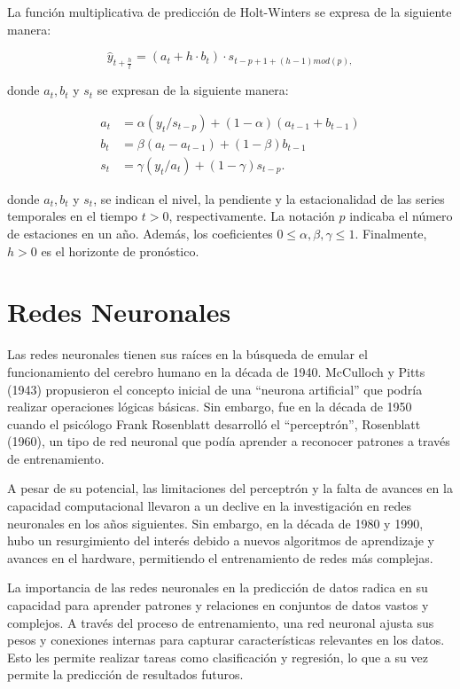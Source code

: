 \documentclass[
  letterpaper,
  DIV=11,
  numbers=noendperiod]{scrreport}
\theoremstyle{plain}
\theoremstyle{definition}
\theoremstyle{definition}
\theoremstyle{plain}
\theoremstyle{remark}
\begin{document}
La función multiplicativa de predicción de Holt-Winters se expresa de la
siguiente manera:

\[ \hat{y}_{t+\frac{h}{t}}= (a_t+h\cdot b_t)\cdot s_{t-p+1+(h-1)mod(p),} \]

donde \(a_t, b_t\) y \(s_t\) se expresan de la siguiente manera:

\[ \begin{split}a_t &= \alpha(y_t/s_{t-p})+(1-\alpha)(a_{t-1}+b_{t-1})\\ b_t &= \beta(a_t-a_{t-1})+(1-\beta)b_{t-1}\\ s_t &= \gamma(y_t/a_t)+(1-\gamma)s_{t-p}.\end{split} \]

donde \(a_t, b_t\) y \(s_t\), se indican el nivel, la pendiente y la
estacionalidad de las series temporales en el tiempo \(t>0\),
respectivamente. La notación \(p\) indicaba el número de estaciones en
un año. Además, los coeficientes \(0\leq \alpha,\beta, \gamma \leq 1\).
Finalmente, \(h> 0\) es el horizonte de pronóstico.

\part{Redes Neuronales}

Las redes neuronales tienen sus raíces en la búsqueda de emular el
funcionamiento del cerebro humano en la década de 1940. McCulloch y
Pitts (1943) propusieron el concepto inicial de una ``neurona
artificial'' que podría realizar operaciones lógicas básicas. Sin
embargo, fue en la década de 1950 cuando el psicólogo Frank Rosenblatt
desarrolló el ``perceptrón'', Rosenblatt (1960), un tipo de red neuronal
que podía aprender a reconocer patrones a través de entrenamiento.

A pesar de su potencial, las limitaciones del perceptrón y la falta de
avances en la capacidad computacional llevaron a un declive en la
investigación en redes neuronales en los años siguientes. Sin embargo,
en la década de 1980 y 1990, hubo un resurgimiento del interés debido a
nuevos algoritmos de aprendizaje y avances en el hardware, permitiendo
el entrenamiento de redes más complejas.

La importancia de las redes neuronales en la predicción de datos radica
en su capacidad para aprender patrones y relaciones en conjuntos de
datos vastos y complejos. A través del proceso de entrenamiento, una red
neuronal ajusta sus pesos y conexiones internas para capturar
características relevantes en los datos. Esto les permite realizar
tareas como clasificación y regresión, lo que a su vez permite la
predicción de resultados futuros.
\end{document}
